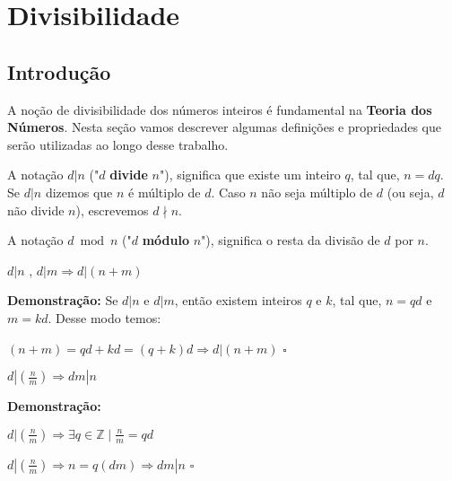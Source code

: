 
\chapter{Divisibilidade} %

\label{Chapter1} %


\section{Introdução}
A noção de divisibilidade dos números inteiros é fundamental na \textbf{Teoria dos Números}.
Nesta seção vamos descrever algumas definições e propriedades que serão utilizadas ao longo desse trabalho.

\begin{definition}
A notação $d|n$ ("$d$ \textbf{divide} $n$"), significa que existe um inteiro $q$, tal que, $n = dq$.
Se $d|n$ dizemos que $n$ é múltiplo de $d$. Caso $n$ não seja múltiplo de $d$ (ou seja, $d$ não divide $n$), escrevemos $d \nmid n$.
\end{definition}

\begin{definition}
A notação $d\bmod n$ ("$d$ \textbf{módulo} $n$"), significa o resta da divisão de $d$ por $n$.
\end{definition}

\begin{proposition}\label{divisibilidade_transitiva}
$d|n$ , $d|m \Rightarrow d|(n+m)$
\end{proposition}
\textbf{Demonstração:}
Se $d|n$ e $d|m$, então existem inteiros $q$ e $k$, tal que, $n = qd$ e $m = kd$. Desse modo temos:

$(n+m) = qd + kd = (q + k)d \Rightarrow d|(n+m) $ $\square$


\begin{proposition}\label{divisibilidade_fracao}
$d|(\frac{n}{m}) \Rightarrow dm|n$
\end{proposition}
\textbf{Demonstração:}

$d|(\frac{n}{m}) \Rightarrow \exists q \in \mathbb{Z} \mid \frac{n}{m} = qd$

$d|(\frac{n}{m}) \Rightarrow n = q(dm) \Rightarrow dm|n$ $\square$


